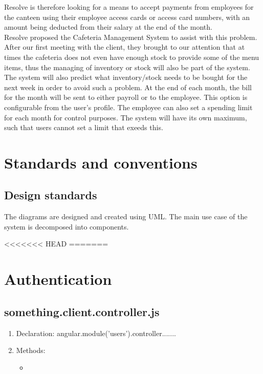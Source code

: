 \documentclass[a4paper,12pt]{article}
\begin{document}
Resolve is therefore looking for a means to accept payments from employees for the canteen using their employee access cards or access card numbers, with an amount being deducted from their salary at the end of the month.\\

Resolve proposed the Cafeteria Management System to assist with this problem.
After our first meeting with the client, they brought to our attention that at times the cafeteria does not even have enough stock to provide some of the menu items, thus the managing of inventory or stock will also be part of the system. The system will also predict what inventory/stock needs to be bought for the next week in order to avoid such a problem. At the end of each month, the bill for the month will be sent to either payroll or to the employee. This option is configurable from the user's profile. The employee can also set a spending limit for each month for control purposes. The system will have its own maximum, such that users cannot set a limit that exeeds this. 


\section{Standards and conventions}

\subsection{Design standards}
 The diagrams are designed and created using UML. The main use case of the system is decomposed into components.

<<<<<<< HEAD
=======
\section{Authentication}
\subsection{something.client.controller.js}
\begin{enumerate}
\item Declaration: angular.module('users').controller....... 
\item Methods:
	\begin{itemize}
		\item
	\end{itemize}	
\end{enumerate}
\end{document}
